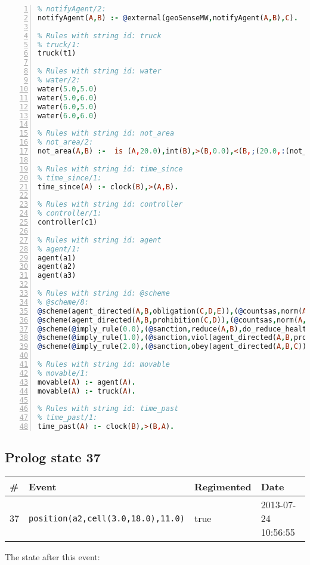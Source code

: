 \documentclass[11pt]{article}\usepackage[utf8]{inputenc}\usepackage{geometry}
\begin{document}
\begin{lstlisting}[language=Prolog, numbers=left]
% Rules with string id: notifyAgent
% notifyAgent/2:
notifyAgent(A,B) :- @external(geoSenseMW,notifyAgent(A,B),C).

% Rules with string id: truck
% truck/1:
truck(t1)

% Rules with string id: water
% water/2:
water(5.0,5.0)
water(5.0,6.0)
water(6.0,5.0)
water(6.0,6.0)

% Rules with string id: not_area
% not_area/2:
not_area(A,B) :-  is (A,20.0),int(B),>(B,0.0),<(B,;(20.0,:(not_area(A,B), is (-(B),20.0)))),int(A),>(A,0.0),<(A,;(20.0,:(area(A,B),-(int(A))))),int(B),>(A,0.0),>(B,0.0),<(A,21.0),<(B,21.0).

% Rules with string id: time_since
% time_since/1:
time_since(A) :- clock(B),>(A,B).

% Rules with string id: controller
% controller/1:
controller(c1)

% Rules with string id: agent
% agent/1:
agent(a1)
agent(a2)
agent(a3)

% Rules with string id: @scheme
% @scheme/8:
@scheme(agent_directed(A,B,obligation(C,D,E)),(@countsas,norm(A,B,F,obligation(C,D,E)),F),false,(listTrue(C)),(time_past(D)),false,[plus(viol(agent_directed(A,B,obligation(C,D,E))))|[]],[plus(obey(agent_directed(A,B,obligation(C,D,E))))|[]])
@scheme(agent_directed(A,B,prohibition(C,D)),(@countsas,norm(A,B,E,prohibition(C,D)),E),(listTrue(C)),false,(false),false,[plus(viol(agent_directed(A,B,prohibition(C,D))))|[]],[plus(obey(agent_directed(A,B,prohibition(C,D))))|[]])
@scheme(@imply_rule(0.0),(@sanction,reduce(A,B),do_reduce_health(A,B),notifyAgent(A,changed(status))),true,false,false,false,[min(reduce(A,B))|[]],[])
@scheme(@imply_rule(1.0),(@sanction,viol(agent_directed(A,B,prohibition(C,D))),do_sanction(D)),true,false,false,false,[min(viol(agent_directed(A,B,prohibition(C,D))))|[]],[])
@scheme(@imply_rule(2.0),(@sanction,obey(agent_directed(A,B,C))),true,false,false,false,[min(obey(agent_directed(A,B,C)))|[]],[])

% Rules with string id: movable
% movable/1:
movable(A) :- agent(A).
movable(A) :- truck(A).

% Rules with string id: time_past
% time_past/1:
time_past(A) :- clock(B),>(B,A).

\end{lstlisting}
\clearpage 
\subsection{Prolog state 37}
\begin{table}[ht]
\centering 
\begin{tabular}{l l l l} 
\textbf{\#} & \textbf{Event} & \textbf{Regimented} & \textbf{Date} \\ [0.5ex] 
\hline
37&\texttt{position(a2,cell(3.0,18.0),11.0)}&true&2013-07-24 10:56:55\\ [1ex] \hline\end{tabular}
\end{table}
The state after this event:
\end{document}
